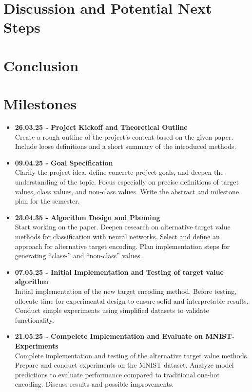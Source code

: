 \documentclass[12pt,fleqn,a4paper]{article}
\begin{document}
\section{Discussion and Potential Next Steps}

\section{Conclusion}

\newpage

\section{Milestones} %
\begin{itemize}
\item {\textbf{26.03.25 - Project Kickoff and Theoretical Outline} \\ Create a rough outline of the project's content based on the given paper. Include loose definitions and a short summary of the introduced methods.}

\item{\textbf{09.04.25 - Goal Specification} \\ Clarify the project idea, define concrete project goals, and deepen the understanding of the topic. Focus especially on precise definitions of target values, class values, and non-class values. Write the abstract and milestone plan for the semester.}

\item{\textbf{23.04.35 - Algorithm Design and Planning} \\ Start working on the paper. Deepen research on alternative target value methods for classification with neural networks. Select and define an approach for alternative target encoding. Plan implementation steps for generating ``class-'' and ``non-class'' values.}

\item{\textbf{07.05.25 - Initial Implementation and Testing of target value algorithm} \\ Initial implementation of the new target encoding method.  Before testing, allocate time for experimental design to ensure solid and interpretable results. Conduct simple experiments using simplified datasets to validate functionality.}

\item{\textbf{21.05.25 - Compelete Implementation and Evaluate on MNIST-Experiments} \\ Complete implementation and testing of the alternative target value methods. Prepare and conduct experiments on the MNIST dataset. Analyze model predictions to evaluate performance compared to traditional one-hot encoding. Discuss results and possible improvements.}


\end{itemize}
\end{document}
